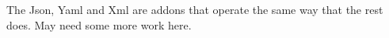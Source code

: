 The Json, Yaml and Xml are addons that operate the same way that the
rest does. May need some more work here.
